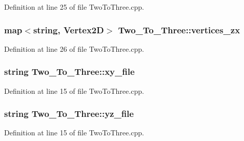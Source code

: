 Definition at line 25 of file Two\+To\+Three.\+cpp.

\subsubsection[{\texorpdfstring{vertices\+\_\+zx}{vertices_zx}}]{\setlength{\rightskip}{0pt plus 5cm}map$<$string, {\bf Vertex2D}$>$ Two\+\_\+\+To\+\_\+\+Three\+::vertices\+\_\+zx}\hypertarget{class_two___to___three_a4bd1e4471ca424af9640f70f6b146fb1}{}\label{class_two___to___three_a4bd1e4471ca424af9640f70f6b146fb1}


Definition at line 26 of file Two\+To\+Three.\+cpp.

\subsubsection[{\texorpdfstring{xy\+\_\+file}{xy_file}}]{\setlength{\rightskip}{0pt plus 5cm}string Two\+\_\+\+To\+\_\+\+Three\+::xy\+\_\+file}\hypertarget{class_two___to___three_a552bbac302db3a8d39d0b0c9014e717d}{}\label{class_two___to___three_a552bbac302db3a8d39d0b0c9014e717d}


Definition at line 15 of file Two\+To\+Three.\+cpp.

\subsubsection[{\texorpdfstring{yz\+\_\+file}{yz_file}}]{\setlength{\rightskip}{0pt plus 5cm}string Two\+\_\+\+To\+\_\+\+Three\+::yz\+\_\+file}\hypertarget{class_two___to___three_a17e155076c64e9207f9e10d7db944fbe}{}\label{class_two___to___three_a17e155076c64e9207f9e10d7db944fbe}


Definition at line 15 of file Two\+To\+Three.\+cpp.

